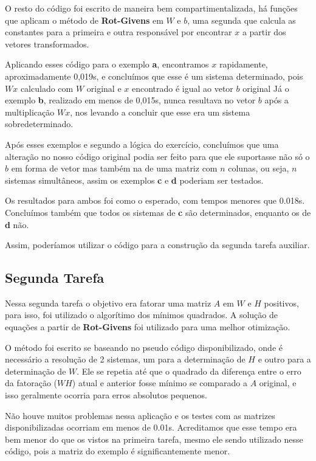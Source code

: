 \documentclass[a4paper, 12pt]{article}
\begin{document}
    O resto do código foi escrito de maneira bem compartimentalizada, há funções que aplicam o método de \textbf{Rot-Givens} em $W$ e $b$, uma segunda que calcula as constantes para a primeira e outra responsável por encontrar $x$ a partir dos vetores transformados.

    Aplicando esses código para o exemplo \textbf{a}, encontramos $x$ rapidamente, aproximadamente 0,019s, e concluímos que esse é um sistema determinado, pois $Wx$ calculado com  $W$ original e $x$ encontrado é igual ao vetor $b$ original
    Já o exemplo \textbf{b}, realizado em menos de 0,015s, nunca resultava no vetor $b$ após a multiplicação $Wx$, nos levando a concluir que esse era um sistema sobredeterminado.

    Após esses exemplos e segundo a lógica do exercício, concluímos que uma alteração no nosso código original podia ser feito para que ele suportasse não só o $b$ em forma de vetor mas também na de uma matriz com $n$ colunas, ou seja, $n$ sistemas simultâneos, assim os exemplos \textbf{c} e \textbf{d} poderiam ser testados.

    Os resultados para ambos foi como o esperado, com tempos menores que 0.018s.
    Concluímos também que todos os sistemas de  \textbf{c} são determinados, enquanto os de  \textbf{d} não.

    Assim, poderíamos utilizar o código para a construção da segunda tarefa auxiliar.

\subsection{Segunda Tarefa}

    Nessa segunda tarefa o objetivo era fatorar uma matriz $A$ em $W$ e  $H$ positivos, para isso, foi utilizado o algorítimo dos mínimos quadrados.
    A solução de equações a partir de \textbf{Rot-Givens} foi utilizado para uma melhor otimização.

    O método foi escrito se baseando no pseudo código disponibilizado, onde é necessário a resolução de 2 sistemas, um para a determinação de $H$ e outro para a determinação de $W$.
    Ele se repetia até que o quadrado da diferença entre o erro da fatoração ($WH$) atual e anterior fosse mínimo se comparado a $A$ original, e isso geralmente ocorria para erros absolutos pequenos.

    Não houve muitos problemas nessa aplicação e os testes com as matrizes disponibilizadas ocorriam em menos de 0.01s.
    Acreditamos que esse tempo era bem menor do que os vistos na primeira tarefa, mesmo ele sendo utilizado nesse código, pois a matriz do exemplo é significantemente menor.
\end{document}
